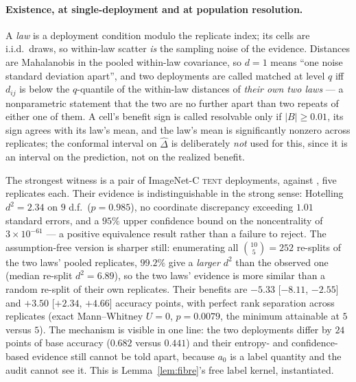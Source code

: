 \paragraph{Existence, at single-deployment and at population resolution.} A \emph{law} is a
deployment condition modulo the replicate index; its cells are i.i.d.\ draws, so within-law scatter
\emph{is} the sampling noise of the evidence. Distances are Mahalanobis in the pooled within-law
covariance, so $d{=}1$ means ``one noise standard deviation apart'', and two deployments are called
matched at level $q$ iff $d_{ij}$ is below the $q$-quantile of the within-law distances of
\emph{their own two laws} --- a nonparametric statement that the two are no further apart than two
repeats of either one of them. A cell's benefit sign is called resolvable only if
$|B|\ge0.01$, its sign agrees with its law's mean, and the law's mean is significantly nonzero
across replicates; the conformal interval on $\widehat\Delta$ is deliberately \emph{not} used for
this, since it is an interval on the prediction, not on the realized benefit.

The strongest witness is a pair of ImageNet-C \textsc{tent} deployments,
 against
, five replicates each. Their evidence is
indistinguishable in the strong sense: Hotelling $d^2=2.34$ on $9$ d.f.\ ($p=0.985$), no coordinate
discrepancy exceeding $1.01$ standard errors, and a $95\%$ upper confidence bound on the
noncentrality of $3\times10^{-61}$ --- a positive equivalence result rather than a failure to reject. The
assumption-free version is sharper still: enumerating all $\binom{10}{5}=252$ re-splits of the two
laws' pooled replicates, $99.2\%$ give a \emph{larger} $d^2$ than the observed one (median re-split
$d^2=6.89$), so the two laws' evidence is more similar than a random re-split of their own
replicates. Their benefits are $-5.33$ [$-8.11$, $-2.55$] and $+3.50$ [$+2.34$, $+4.66$] accuracy
points, with perfect rank separation across replicates (exact Mann--Whitney $U=0$, $p=0.0079$, the
minimum attainable at $5$ versus $5$). The mechanism is visible in one line: the two deployments
differ by $24$ points of base accuracy ($0.682$ versus $0.441$) and their entropy- and
confidence-based evidence still cannot be told apart, because $a_0$ is a label quantity and the
audit cannot see it. This is Lemma~\ref{lem:fibre}'s free label kernel, instantiated.

